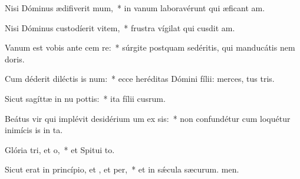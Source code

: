 \item Nisi Dóminus ædifiverit mum,~* in vanum laboravérunt qui æficant am.
\item Nisi Dóminus custodíerit vitem,~* frustra vígilat qui cusdit am.
\item Vanum est vobis ante cem re:~* súrgite postquam sedéritis, qui manducátis nem doris.
\item Cum déderit diléctis is num:~* ecce heréditas Dómini fílii: merces, tus tris.
\item Sicut sagíttæ in nu pottis:~* ita fílii cusrum.
\item Beátus vir qui implévit desidérium um ex sis:~* non confundétur cum loquétur inimícis is in ta.
\item Glória tri, et o,~* et Spitui to.
\item Sicut erat in princípio, et , et per,~* et in sǽcula sæcurum. men.
